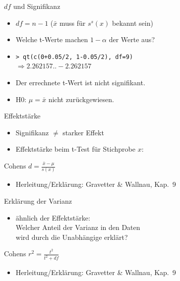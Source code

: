 
\begin{frame}
  {$df$ und Signifikanz}
  \begin{itemize}[<+->]
    \item \alert{$df=n-1$} ($\bar{x}$ muss für $s^s(x)$ bekannt sein)
    \item Welche t-Werte machen $1-\alpha$ der Werte aus?
    \item \texttt{> qt(c(0+0.05/2, 1-0.05/2), df=9)\\
      $\Rightarrow 2.262157 .. -2.262157$}
    \item Der errechnete t-Wert ist nicht signifikant.
    \item H0: $\mu=\bar{x}$ nicht zurückgewiesen.
  \end{itemize}
\end{frame}

\begin{frame}
  {Effektstärke}
  \begin{itemize}[<+->]
    \item Signifikanz $\neq$ starker Effekt
    \item Effektstärke beim t-Test für Stichprobe $x$:
  \end{itemize}
  \pause
  \begin{center}
    \alert{Cohens $d=\frac{\bar{x}-\mu}{s(x)}$}
  \end{center}
  \pause
  \begin{itemize}
    \item Herleitung\slash Erklärung: Gravetter \& Wallnau, Kap.\ 9
  \end{itemize}
\end{frame}

\begin{frame}
  {Erklärung der Varianz}
  \begin{itemize}
    \item ähnlich der Effektstärke: \\
      \alert{Welcher Anteil der Varianz in den Daten\\
      wird durch die Unabhängige erklärt?}
  \end{itemize}
  \pause
  \begin{center}
    \alert{Cohens $r^2=\frac{t^2}{t^2+df}$}
  \end{center}
  \pause
  \begin{itemize}
    \item Herleitung\slash Erklärung: Gravetter \& Wallnau, Kap.\ 9
  \end{itemize}
\end{frame}

